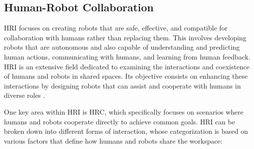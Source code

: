 

\subsection{Human-Robot Collaboration}
\label{subsection:human-robot-collab}
% 
\ac{HRI} focuses on creating robots that are safe, effective, and compatible for collaboration with humans rather than replacing them.
This involves developing robots that are autonomous and also capable of understanding and predicting human actions, communicating with humans, 
and learning from human feedback. \ac{HRI} is an extensive field dedicated to examining the interactions and coexistence of humans and robots in shared spaces. 
Its objective consists on enhancing these interactions by designing robots that can assist and cooperate with humans in diverse roles \cite{Ogenyi2021}.

One key area within \ac{HRI} is \ac{HRC}, which specifically focuses on scenarios where humans and robots cooperate directly to achieve common goals.
\ac{HRI} can be broken down into different forms of interaction, whose categorization is based on various factors that define how 
humans and robots share the workspace:

